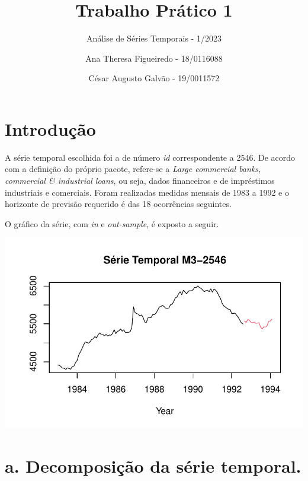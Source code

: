 \documentclass[
  letterpaper,
  DIV=11,
  numbers=noendperiod]{scrartcl}
\title{Trabalho Prático 1}
\subtitle{Análise de Séries Temporais - 1/2023}
\author{Ana Theresa Figueiredo - 18/0116088 \and César Augusto Galvão -
19/0011572}
\date{}
\renewcommand*\contentsname{Table of contents}
\newcommand\contentsname{Table of contents}
\begin{document}
\maketitle
\ifdefined\Shaded\renewenvironment{Shaded}{\begin{tcolorbox}[enhanced, boxrule=0pt, interior hidden, breakable, sharp corners, borderline west={3pt}{0pt}{shadecolor}, frame hidden]}{\end{tcolorbox}}\fi

\renewcommand*\contentsname{Table of contents}
{
\hypersetup{linkcolor=}
\setcounter{tocdepth}{3}
\tableofcontents
}
\newpage{}

\hypertarget{introduuxe7uxe3o}{%
\section{Introdução}\label{introduuxe7uxe3o}}

A série temporal escolhida foi a de número \emph{id} correspondente a
2546. De acordo com a definição do próprio pacote, refere-se a
\emph{Large commercial banks, commercial \& industrial loans}, ou seja,
dados financeiros e de impréstimos industriais e comerciais. Foram
realizadas medidas mensais de 1983 a 1992 e o horizonte de previsão
requerido é das 18 ocorrências seguintes.

O gráfico da série, com \emph{in} e \emph{out-sample}, é exposto a
seguir.

\includegraphics{T1_grupo15_files/figure-pdf/plot-serie-total-1.pdf}

\hypertarget{a.-decomposiuxe7uxe3o-da-suxe9rie-temporal.}{%
\section{a. Decomposição da série
temporal.}\label{a.-decomposiuxe7uxe3o-da-suxe9rie-temporal.}}
\end{document}
